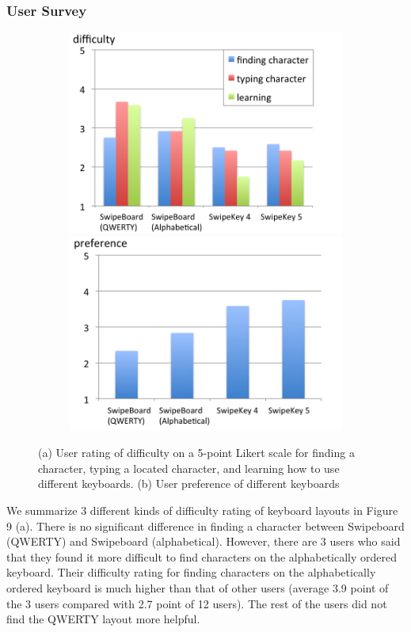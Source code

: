 \subsubsection{User Survey}

\begin{figure}[h]
  \begin{subfigure}{1\columnwidth}
  \centering
  \includegraphics[width=.8\columnwidth]{figures/F10-1.png}
  \caption{}
  \includegraphics[width=.8\columnwidth]{figures/F10-2.png}
  \caption{}
  \label{fig:f10}
  \end{subfigure}
  \caption{ (a) User rating of difficulty on a 5-point Likert scale for finding a character, typing a located character, and learning how to use different keyboards. (b) User preference of different keyboards}
\end{figure}

We summarize 3 different kinds of difficulty rating of keyboard layouts in Figure 9 (a). There is no significant difference in finding a character between Swipeboard (QWERTY) and Swipeboard (alphabetical). However, there are 3 users who said that they found it more difficult to find characters on the alphabetically ordered keyboard. Their difficulty rating for finding characters on the alphabetically ordered keyboard is much higher than that of other users (average 3.9 point of the 3 users compared with 2.7 point of 12 users). The rest of the users did not find the QWERTY layout more helpful.

